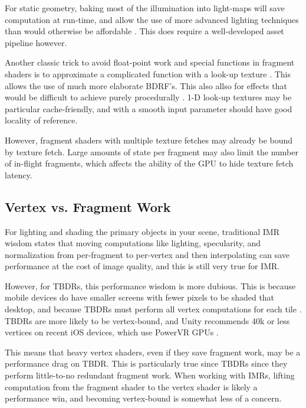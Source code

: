 For static geometry, baking most of the illumination into light-maps will save computation at run-time, and allow the use of more advanced lighting techniques than would otherwise be affordable \cite{lightmaps} \cite{unity_graphics_perf}.  This does require a well-developed asset pipeline however.

Another classic trick to avoid float-point work and special functions in fragment shaders is to approximate a complicated function with a look-up texture \cite{ios_shader_tricks}.  This allows the use of much more elaborate BDRF's.  This also allso for effects that would be difficult to achieve purely procedurally \cite{illustrative}.  1-D look-up textures may be particular cache-friendly, and with a smooth input parameter should have good locality of reference.  

However, fragment shaders with multiple texture fetches may already be bound by texture fetch.  Large amounts of state per fragment may also limit the number of in-flight fragments, which affects the ability of the GPU to hide texture fetch latency.

\subsection{Vertex vs. Fragment Work}\label{Jon-McCaffrey-Vertex-vs-Fragment-Work}

For lighting and shading the primary objects in your scene, traditional IMR wisdom states that moving computations like lighting, specularity, and normalization from per-fragment to per-vertex and then interpolating can save performance at the cost of image quality, and this is still very true for IMR.

However, for TBDRs, this performance wisdom is more dubious.  This is because mobile devices do have smaller screens with fewer pixels to be shaded that desktop, and because TBDRs must perform all vertex computations for each tile \cite{apple_vertex}.  TBDRs are more likely to be vertex-bound, and Unity recommends 40k or less vertices on recent iOS devices, which use PowerVR GPUs \cite{unity_graphics_perf}.

This means that heavy vertex shaders, even if they save fragment work, may be a
performance drag on TBDR.  This is particularly true since TBDRs since they
perform little-to-no redundant fragment work.  When working with IMRs, lifting
computation from the fragment shader to the vertex shader is likely a
performance win, and becoming vertex-bound is somewhat less of a concern.

